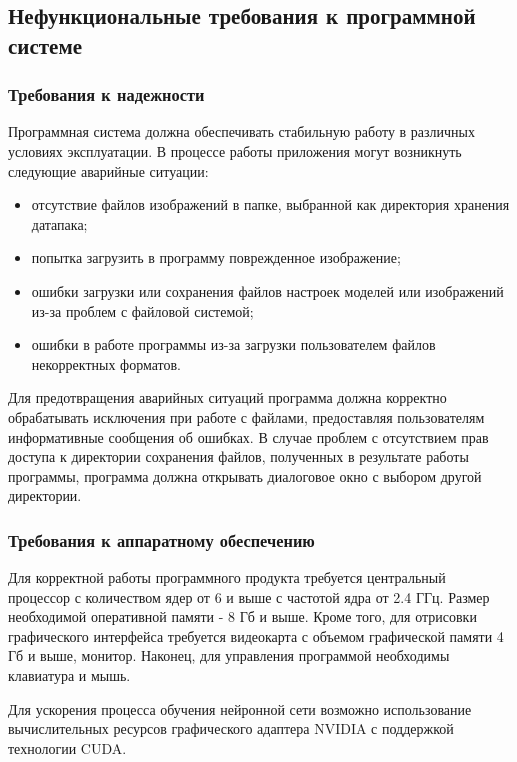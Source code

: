 \subsection{Нефункциональные требования к программной системе}

\subsubsection{Требования к надежности}

Программная система должна обеспечивать стабильную работу в различных условиях эксплуатации. В процессе работы приложения могут возникнуть следующие аварийные ситуации:
\begin{itemize}
	\item отсутствие файлов изображений в папке, выбранной как директория хранения датапака;
	\item попытка загрузить в программу поврежденное изображение;
	\item ошибки загрузки или сохранения файлов настроек моделей или изображений из-за проблем с файловой системой;
	\item ошибки в работе программы из-за загрузки пользователем файлов некорректных форматов.
\end{itemize} 

Для предотвращения аварийных ситуаций программа должна корректно обрабатывать исключения при работе с файлами, предоставляя пользователям информативные сообщения об ошибках. В случае проблем с отсутствием прав доступа к  директории сохранения файлов, полученных в результате работы программы, программа должна открывать диалоговое окно с выбором другой директории.

\subsubsection{Требования к аппаратному обеспечению}

Для корректной работы программного продукта требуется центральный процессор с количеством ядер от 6 и выше с частотой ядра от 2.4 ГГц. Размер необходимой оперативной памяти - 8 Гб и выше. Кроме того, для отрисовки графического интерфейса требуется видеокарта с объемом графической памяти 4 Гб и выше, монитор. Наконец, для управления программой необходимы клавиатура и мышь.

Для ускорения процесса обучения нейронной сети возможно использование вычислительных ресурсов графического адаптера NVIDIA с поддержкой технологии CUDA. 

